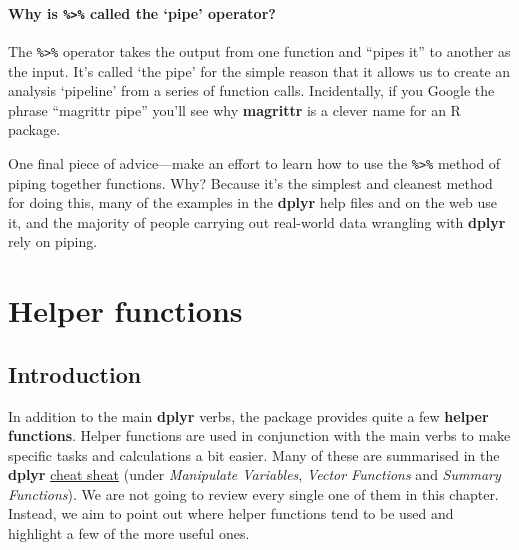 \documentclass[
]{book}
\newenvironment{greybox}{
  \definecolor{shadecolor}{rgb}{0.95,0.95,0.95}  %
  \color{black}
  \begin{shaded}}
 {\end{shaded}}
\newenvironment{infobox}[1]
  {
  \begin{itemize}
  \renewcommand{\labelitemi}{
    \raisebox{-.7\height}[0pt][0pt]{
      {\setkeys{Gin}{width=3em,keepaspectratio}
        \texttt{[image: images/\#1]}}
    }
  }
  \setlength{\fboxsep}{1em}
  \begin{greybox}
  \item
  }
  {
  \end{greybox}
  \end{itemize}
  }
\begin{document}
\begin{infobox}{information}

\hypertarget{why-is-called-the-pipe-operator}{%
\subsubsection*{\texorpdfstring{Why is \texttt{\%\textgreater{}\%} called the `pipe' operator?}{Why is \%\textgreater\% called the `pipe' operator?}}\label{why-is-called-the-pipe-operator}}

The \texttt{\%\textgreater{}\%} operator takes the output from one function and ``pipes it'' to another as the input. It's called `the pipe' for the simple reason that it allows us to create an analysis `pipeline' from a series of function calls. Incidentally, if you Google the phrase ``magrittr pipe'' you'll see why \textbf{magrittr} is a clever name for an R package.

\end{infobox}

One final piece of advice---make an effort to learn how to use the \texttt{\%\textgreater{}\%} method of piping together functions. Why? Because it's the simplest and cleanest method for doing this, many of the examples in the \textbf{dplyr} help files and on the web use it, and the majority of people carrying out real-world data wrangling with \textbf{dplyr} rely on piping.

\hypertarget{helper-functions}{%
\chapter{Helper functions}\label{helper-functions}}

\hypertarget{introduction-5}{%
\section{Introduction}\label{introduction-5}}

In addition to the main \textbf{dplyr} verbs, the package provides quite a few \textbf{helper functions}. Helper functions are used in conjunction with the main verbs to make specific tasks and calculations a bit easier. Many of these are summarised in the \textbf{dplyr} \href{https://github.com/rstudio/cheatsheets/raw/master/data-transformation.pdf}{cheat sheat} (under \emph{Manipulate Variables}, \emph{Vector Functions} and \emph{Summary Functions}). We are not going to review every single one of them in this chapter. Instead, we aim to point out where helper functions tend to be used and highlight a few of the more useful ones.
\end{document}
